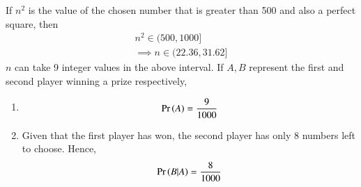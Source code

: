 \iffalse
Let
\begin{table}[H]
	\label{Defining variables}
	
	\end{table}
	\fi
If $n^2$ is the value of the chosen number that is greater than 500 and also a perfect square, then
\begin{align}
n^2 \in (500,1000] \\
\implies n \in (22.36,31.62]
\end{align}
$n$ can take 9 integer values in the above interval.
If $A, B$ represent the first and second player winning a prize respectively, 
\begin{enumerate}
\item 
\begin{align}
               \Pr\left(A\right) = \frac{9}{1000}
\end{align}
\item 
Given that the first player has won, the second player has only 8 numbers left to choose.  Hence, 
\begin{align}
\Pr\left(B|A\right)=\frac{8}{1000}
\end{align}
\end{enumerate}
